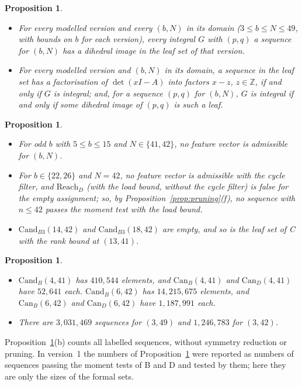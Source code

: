 \documentclass[11pt]{article}
\newtheorem{proposition}[lemma]{Proposition}
\theoremstyle{definition}
\theoremstyle{remark}
\newcommand{\Z}{\mathbb Z}
\begin{document}
\begin{proposition}
\begin{itemize}
 the moment test.
\item[(g)] For every modelled version and every $(b,N)$ in its domain
 ($3\le b\le N\le49$, with bounds on $b$ for each version), every integral $G$
 with $(p,q)$ a sequence for $(b,N)$ has a dihedral image in the leaf set of
 that version.
\item[(h)] For every modelled version and $(b,N)$ in its domain, a sequence in
 the leaf set has a factorisation of $\det(xI-A)$ into
 factors $x-z$, $z\in\Z$, if and only if $G$ is integral; and, for a sequence
 $(p,q)$ for $(b,N)$, $G$ is integral if and only if some dihedral image of
 $(p,q)$ is such a leaf.
\end{itemize}
\end{proposition}

\begin{proposition}\label{prop:empty}
\begin{itemize}
\item[(a)] For odd $b$ with $5\le b\le15$ and $N\in\{41,42\}$, no feature
 vector is admissible for $(b,N)$.
\item[(b)] For $b\in\{22,26\}$ and $N=42$, no feature vector is admissible with
 the cycle filter, and $\mathrm{Reach}_D$ (with the load bound, without the cycle
 filter) is false for the empty assignment; so, by
 Proposition~\ref{prop:pruning}(f), no sequence with $n\le42$ passes the moment
 test with the load bound.
\item[(c)] $\mathrm{Cand}_{B3}(14,42)$ and $\mathrm{Cand}_{B3}(18,42)$ are
 empty, and so is the leaf set of C with the rank bound at $(13,41)$.
\end{itemize}
\end{proposition}

\begin{proposition}\label{prop:counts}
\begin{itemize}
\item[(a)] $\mathrm{Cand}_B(4,41)$ has $410{,}544$ elements, and
 $\mathrm{Can}_B(4,41)$ and $\mathrm{Can}_D(4,41)$ have $52{,}641$ each.
 $\mathrm{Cand}_B(6,42)$ has $14{,}215{,}675$ elements, and
 $\mathrm{Can}_B(6,42)$ and $\mathrm{Can}_D(6,42)$ have $1{,}187{,}991$ each.
\item[(b)] There are $3{,}031{,}469$ sequences for $(3,49)$ and $1{,}246{,}783$
 for $(3,42)$.
\end{itemize}
\end{proposition}

Proposition~\ref{prop:counts}(b) counts all labelled sequences, without
symmetry reduction or pruning. In version~1 the numbers of
Proposition~\ref{prop:counts} were reported as numbers of sequences passing
the moment tests of B and D and tested by them; here they are only the sizes of
the formal sets.
\end{document}
